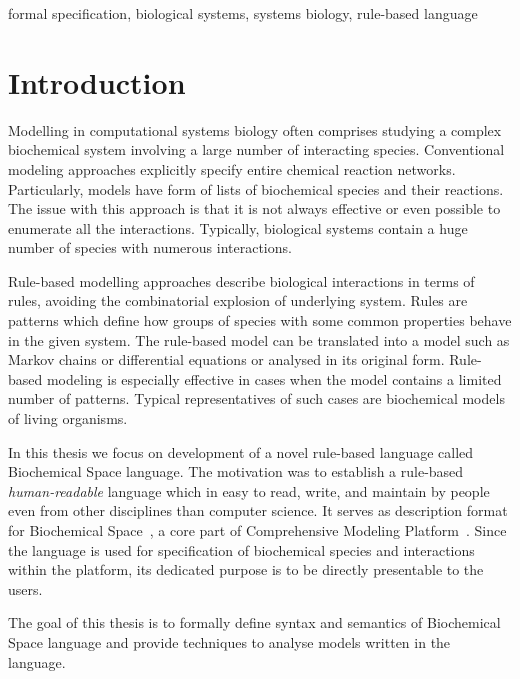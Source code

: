 \documentclass[12pt]{fithesis2}
\begin{document}
\begin{ThesisKeyWords}
formal specification, biological systems, systems biology, rule-based language
\end{ThesisKeyWords}

\MainMatter
\tableofcontents

\chapter{Introduction}

Modelling in computational systems biology often comprises studying a complex biochemical system involving a large number of interacting species. Conventional modeling approaches explicitly specify entire chemical reaction networks. Particularly, models have form of lists of biochemical species and their reactions. The issue with this approach is that it is not always effective or even possible to enumerate all the interactions. Typically, biological systems contain a huge number of species with numerous interactions.

Rule-based modelling approaches describe biological interactions in terms of rules, avoiding the combinatorial explosion of underlying system. Rules are patterns which define how groups of species with some common properties behave in the given system. The rule-based model can be translated into a model such as Markov chains or differential equations or analysed in its original form. Rule-based modeling is especially effective in cases when the model contains a limited number of patterns. Typical representatives of such cases are biochemical models of living organisms.

In this thesis we focus on development of a novel rule-based language called Biochemical Space language. The motivation was to establish a rule-based \emph{human-readable} language which in easy to read, write, and maintain by people even from other disciplines than computer science. It serves as description format for Biochemical Space~\cite{BCS}, a core part of Comprehensive Modeling Platform~\cite{cs2bio2013}. Since the language is used for specification of biochemical species and interactions within the platform, its dedicated purpose is to be directly presentable to the users.

The goal of this thesis is to formally define syntax and semantics of Biochemical Space language and provide techniques to analyse models written in the language. 
\end{document}

